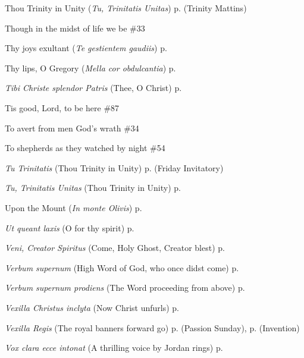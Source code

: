 \begin{hangparas}{1.25em}{1}
Thou Trinity in Unity (\textit{Tu, Trinitatis Unitas}) \dotfill p. \pageref{TrinityMattins} (Trinity Mattins)
\par\noindent
Though in the midst of life we be \dotfill \#33
\par\noindent
Thy joys exultant (\textit{Te gestientem gaudiis}) \dotfill p. \pageref{HolyRosaryEvensongII}
\par\noindent
Thy lips, O Gregory (\textit{Mella cor obdulcantia}) \dotfill p. \pageref{GregoryMattins}
\par\noindent
\textit{Tibi Christe splendor Patris} (Thee, O Christ) \dotfill p. \pageref{MichaelEvensong}
\par\noindent
Tis good, Lord, to be here \dotfill \#87
\par\noindent
To avert from men God's wrath \dotfill \#34
\par\noindent
To shepherds as they watched by night \dotfill \#54
\par\noindent
\textit{Tu Trinitatis} (Thou Trinity in Unity) \dotfill p. \pageref{FridayInvitatory} (Friday Invitatory)
\par\noindent
\textit{Tu, Trinitatis Unitas} (Thou Trinity in Unity) \dotfill p. \pageref{TrinityMattins}
\par\noindent
Upon the Mount (\textit{In monte Olivis}) \dotfill p. \pageref{HolyRosaryInvitatory}
\par\noindent
\textit{Ut queant laxis} (O for thy spirit) \dotfill p. \pageref{JohnBaptistEvensong}
\par\noindent
\textit{Veni, Creator Spiritus} (Come, Holy Ghost, Creator blest) \dotfill p. \pageref{WhitsundayEvensong}
\par\noindent
\textit{Verbum supernum} (High Word of God, who once didst come) \dotfill p. \pageref{FirstAdventInvitatory}
\par\noindent
\textit{Verbum supernum prodiens} (The Word proceeding from above) \dotfill p. \pageref{CorpusChristiMattins}
\par\noindent
\textit{Vexilla Christus inclyta} (Now Christ unfurls) \dotfill p. \pageref{ChristTheKingMattins}
\par\noindent
\textit{Vexilla Regis} (The royal banners forward go) \dotfill p. \pageref{PassionSundayEvensong} (Passion Sunday), p. \pageref{InventionEvensong} (Invention)
\par\noindent
\textit{Vox clara ecce intonat} (A thrilling voice by Jordan rings) \dotfill p. \pageref{FirstAdventMattins}
\par\noindent

\end{hangparas}
